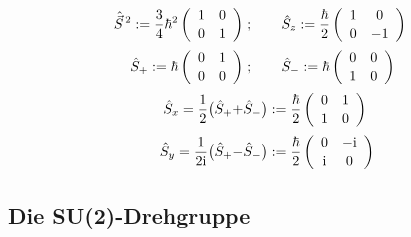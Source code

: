 \documentclass[9pt]{report}
\begin{document}
\begin{align}
\renewcommand{\arraystretch}{1.1}
\hat{\vec{S}}^{\,2}:=
\frac{3}{4}\hbar^{2}\left(\begin{array}{cc}
1
&
0
\\
0
& 
1
\\\end{array}\right) &\;;\qquad
\renewcommand{\arraystretch}{1.1}
\hat{S}_{z}:=
\frac{\hbar}{2}\left(\begin{array}{cc}
1
&
0
\\
0
& 
-1
\\\end{array}\right)
\\
\renewcommand{\arraystretch}{1.1}
\hat{S}_{+}:=
\hbar\left(\begin{array}{cc}
0
&
1
\\
0
& 
0
\\\end{array}\right) &\;;\qquad
\renewcommand{\arraystretch}{1.1}
\hat{S}_{-}:=
\hbar\left(\begin{array}{cc}
0
&
0
\\
1
& 
0
\\\end{array}\right)
\\
\hat{S}_{x}=\frac{1}{2}\big(\hat{S}_{+}+&\hat{S}_{-}\big):=\frac{\hbar}{2}
\renewcommand{\arraystretch}{1.1}
\left(\begin{array}{cc}
0
&
1
\\
1
& 
0
\\\end{array}\right)
\\
\hat{S}_{y}=\frac{1}{2\mathrm{i}}\big(\hat{S}_{+}-&\hat{S}_{-}\big):=\frac{\hbar}{2}
\renewcommand{\arraystretch}{1.1}
\left(\begin{array}{cc}
0
&
-\mathrm{i}
\\
\mathrm{i}
& 
0
\\\end{array}\right)
\end{align}




\subsection{Die SU(2)-Drehgruppe}
\end{document}
